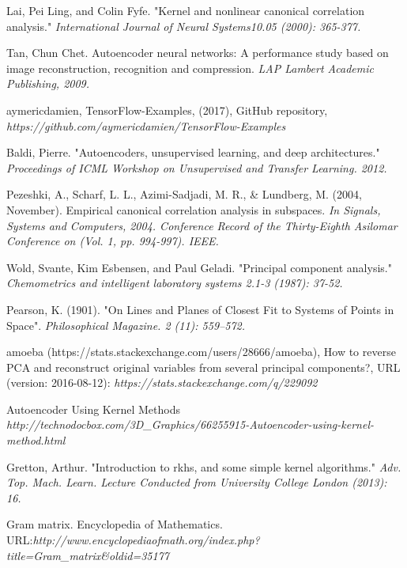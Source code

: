 \documentclass[12pt]{report} %
\begin{document}
\begin{thebibliography}{}

	Lai, Pei Ling, and Colin Fyfe. "Kernel and nonlinear canonical correlation analysis." \textit{International Journal of Neural Systems10.05 (2000): 365-377.}

	Tan, Chun Chet. Autoencoder neural networks: A performance study based on image reconstruction, recognition and compression. \textit{LAP Lambert Academic Publishing, 2009.}

	aymericdamien, TensorFlow-Examples, (2017), GitHub repository, \textit{https://github.com/aymericdamien/TensorFlow-Examples}

	Baldi, Pierre. "Autoencoders, unsupervised learning, and deep architectures." \textit{Proceedings of ICML Workshop on Unsupervised and Transfer Learning. 2012.}

	Pezeshki, A., Scharf, L. L., Azimi-Sadjadi, M. R., \& Lundberg, M. (2004, November). Empirical canonical correlation analysis in subspaces. \textit{In Signals, Systems and Computers, 2004. Conference Record of the Thirty-Eighth Asilomar Conference on (Vol. 1, pp. 994-997). IEEE.}

	Wold, Svante, Kim Esbensen, and Paul Geladi. "Principal component analysis." \textit{Chemometrics and intelligent laboratory systems 2.1-3 (1987): 37-52.}

	Pearson, K. (1901). "On Lines and Planes of Closest Fit to Systems of Points in Space". \textit{Philosophical Magazine. 2 (11): 559–572.}

	amoeba (https://stats.stackexchange.com/users/28666/amoeba), How to reverse PCA and reconstruct original variables from several principal components?, URL (version: 2016-08-12): \textit{https://stats.stackexchange.com/q/229092}

	Autoencoder Using Kernel Methods
	\textit{http://technodocbox.com/3D\_Graphics/66255915-Autoencoder-using-kernel-method.html}

	Gretton, Arthur. "Introduction to rkhs, and some simple kernel algorithms."
	\textit{Adv. Top. Mach. Learn. Lecture Conducted from University College London (2013): 16.}

	Gram matrix. Encyclopedia of Mathematics. \\
	URL:\textit{http://www.encyclopediaofmath.org/index.php?title=Gram\_matrix\&oldid=35177}


\end{thebibliography}
\end{document}

